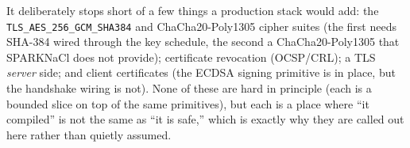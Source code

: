 It deliberately stops short of a few things a production stack would add: the
\texttt{TLS\_AES\_256\_GCM\_SHA384} and ChaCha20-Poly1305 cipher suites (the first
needs SHA-384 wired through the key schedule, the second a ChaCha20-Poly1305 that
SPARKNaCl does not provide); certificate revocation (OCSP/CRL); a TLS \emph{server}
side; and client certificates (the ECDSA signing primitive is in place, but the
handshake wiring is not). None of these are hard in principle (each is a bounded
slice on top of the same primitives), but each is a place where ``it compiled''
is not the same as ``it is safe,'' which is exactly why they are called out here
rather than quietly assumed.

